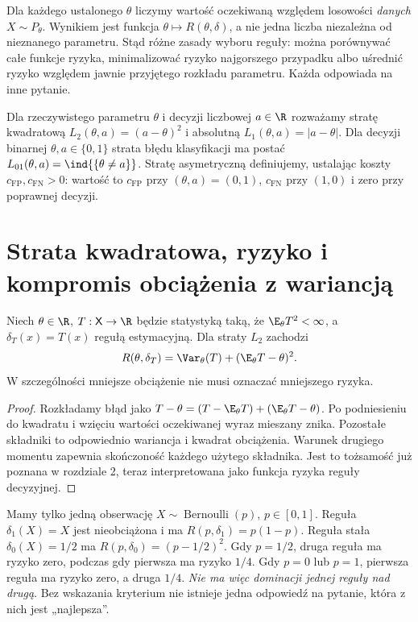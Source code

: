 \begin{uwaga}
Dla każdego ustalonego $\theta$ liczymy wartość oczekiwaną względem
losowości \emph{danych} $X\sim P_\theta$. Wynikiem jest funkcja
$\theta\mapsto R(\theta,\delta)$, a nie jedna liczba niezależna od
nieznanego parametru. Stąd różne zasady wyboru reguły: można
porównywać całe funkcje ryzyka, minimalizować ryzyko najgorszego
przypadku albo uśrednić ryzyko względem jawnie przyjętego rozkładu
parametru. Każda odpowiada na inne pytanie.
\end{uwaga}

\begin{definicja}
Dla rzeczywistego parametru $\theta$ i decyzji liczbowej $a\in\R$
rozważamy stratę kwadratową $L_2(\theta,a)=(a-\theta)^2$ i absolutną
$L_1(\theta,a)=|a-\theta|$. Dla decyzji binarnej
$\theta,a\in\{0,1\}$ strata błędu klasyfikacji ma postać
$L_{01}(\theta,a)=\ind{\{\theta\ne a\}}$.
Stratę asymetryczną definiujemy, ustalając koszty
$c_{\mathrm{FP}},c_{\mathrm{FN}}>0$: wartość to
$c_{\mathrm{FP}}$ przy $(\theta,a)=(0,1)$,
$c_{\mathrm{FN}}$ przy $(1,0)$ i zero przy poprawnej decyzji.
\end{definicja}

\section{Strata kwadratowa, ryzyko i kompromis obciążenia z wariancją}
\begin{twierdzenie}\label{thm:decision-mse}
Niech $\theta\in\R$, $T:\mathsf X\to\R$ będzie statystyką taką, że
$\E_\theta T^2<\infty$, a $\delta_T(x)=T(x)$ regułą estymacyjną.
Dla straty $L_2$ zachodzi
\[
R(\theta,\delta_T)
=\Var_\theta(T)+(\E_\theta T-\theta)^2.
\]
W szczególności mniejsze obciążenie nie musi oznaczać mniejszego ryzyka.
\end{twierdzenie}
\begin{proof}
Rozkładamy błąd jako
$T-\theta=(T-\E_\theta T)+(\E_\theta T-\theta)$.
Po podniesieniu do kwadratu i wzięciu wartości oczekiwanej
wyraz mieszany znika. Pozostałe składniki to odpowiednio wariancja
i kwadrat obciążenia. Warunek drugiego momentu zapewnia skończoność
każdego użytego składnika. Jest to tożsamość już poznana w rozdziale 2,
teraz interpretowana jako funkcja ryzyka reguły decyzyjnej.
\end{proof}

\begin{przyklad}
Mamy tylko jedną obserwację $X\sim\operatorname{Bernoulli}(p)$,
$p\in[0,1]$. Reguła $\delta_1(X)=X$ jest nieobciążona i ma
$R(p,\delta_1)=p(1-p)$. Reguła stała $\delta_0(X)=1/2$ ma
$R(p,\delta_0)=(p-1/2)^2$.
Gdy $p=1/2$, druga reguła ma ryzyko zero, podczas gdy pierwsza ma
ryzyko $1/4$. Gdy $p=0$ lub $p=1$, pierwsza reguła ma ryzyko zero,
a druga $1/4$. \emph{Nie ma więc dominacji jednej reguły nad drugą}.
Bez wskazania kryterium nie istnieje jedna odpowiedź na pytanie,
która z nich jest „najlepsza”.
\end{przyklad}

